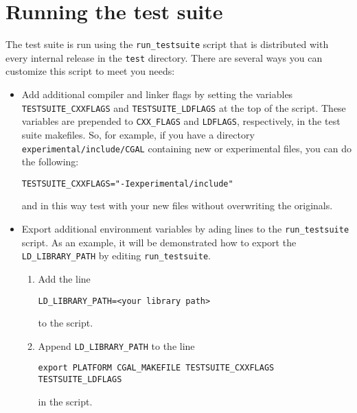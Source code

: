 \section{Running the test suite}
\label{sec:running_test_suite}

The test suite is run using the {\tt run\_testsuite} script that is distributed
with every internal release in the {\tt test} directory.  There are several
ways you can customize this script to meet you needs:

\begin{itemize}
\item Add additional compiler and linker flags by setting the variables
      {\tt TESTSUITE\_CXXFLAGS}%
      and {\tt TESTSUITE\_LDFLAGS} 
      at the top of the
      script.  These variables are prepended to {\tt CXX\_FLAGS} and
      {\tt LDFLAGS}, respectively, in the test suite makefiles.  So, for
      example, if you have a directory \verb|experimental/include/CGAL| 
      containing new or experimental \cgal files,  you can do the following:
      \begin{center}
      \verb|TESTSUITE_CXXFLAGS="-Iexperimental/include"|
      \end{center}
      and in this way test with your new files without overwriting
      the originals.
 
\item Export additional environment variables by ading lines to the 
      {\tt run\_testsuite} script. As an example, it will be demonstrated 
      how to export the {\tt LD\_LIBRARY\_PATH} by editing \texttt{run\_testsuite}.%
      \begin{enumerate}
      \item Add the line
            \begin{center}
               \verb|LD_LIBRARY_PATH=<your library path>|
            \end{center}
            to the script.
      \item Append {\tt LD\_LIBRARY\_PATH} to the line
            \begin{center}
            \verb|export PLATFORM CGAL_MAKEFILE TESTSUITE_CXXFLAGS TESTSUITE_LDFLAGS|
            \end{center}
            in the script.
      \end{enumerate}


\end{itemize}
